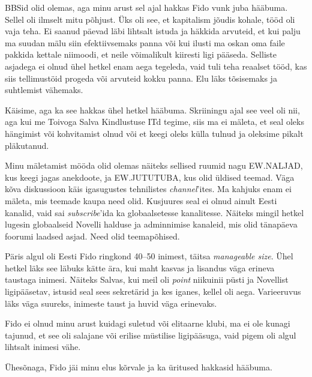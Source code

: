 BBSid olid olemas, aga minu arust sel ajal hakkas Fido vunk juba hääbuma. 
Sellel oli ilmselt mitu põhjust. Üks oli see, et kapitalism jõudis kohale, 
tööd oli vaja teha. Ei saanud päevad läbi lihtsalt istuda ja häkkida 
arvuteid, et kui palju ma suudan mälu siin efektiivsemaks panna 
või kui ilusti ma oskan oma faile pakkida kettale niimoodi, et neile
võimalikult kiiresti ligi pääseda. Selliste asjadega ei olnud ühel 
hetkel enam aega tegeleda, vaid tuli teha reaalset tööd, kas siis tellimustöid
progeda või arvuteid kokku panna. 
Elu läks tõsisemaks ja suhtlemist vähemaks. 


Käisime, aga ka see hakkas ühel hetkel hääbuma. Skriiningu ajal see veel oli nii, aga kui me 
Toivoga Salva Kindlustuse ITd tegime, siis ma ei 
mäleta, et seal oleks hängimist või kohvitamist olnud või et keegi 
oleks külla tulnud ja oleksime pikalt pläkutanud. 


Minu mäletamist mööda olid olemas näiteks sellised ruumid 
nagu EW.NALJAD, kus keegi jagas anekdoote, ja EW.JUTUTUBA, kus olid üldised teemad. Väga kõva 
diskussioon käis igasugustes tehnilistes 
\emph{channel}'ites. Ma kahjuks enam ei mäleta, mis teemade kaupa need olid. 
Kusjuures seal ei olnud ainult Eesti kanalid, vaid sai 
\emph{subscribe}'ida ka globaalsetesse kanalitesse. Näiteks mingil hetkel lugesin globaalseid Novelli halduse ja adminnimise kanaleid, mis olid tänapäeva foorumi laadsed asjad. Need olid 
teemapõhised. 

Päris algul oli Eesti Fido ringkond 40--50 inimest, täitsa 
\emph{manageable size}. Ühel hetkel läks see läbuks kätte ära, kui 
maht kasvas ja lisandus väga erineva taustaga inimesi. Näiteks Salvas, kui meil 
oli \emph{point} niikuinii püsti ja Novellist ligipääsetav, istusid seal sees sekretärid ja kes iganes, kellel oli aega. Varieeruvus läks väga 
suureks, inimeste taust ja huvid väga erinevaks. 


Fido ei olnud minu arust kuidagi suletud või elitaarne klubi, ma ei ole 
kunagi tajunud, et see oli salajane või 
erilise müstilise ligipääsuga, vaid pigem oli algul lihtsalt inimesi vähe. 

Ühesõnaga, Fido jäi minu elus kõrvale ja ka üritused hakkasid hääbuma.

